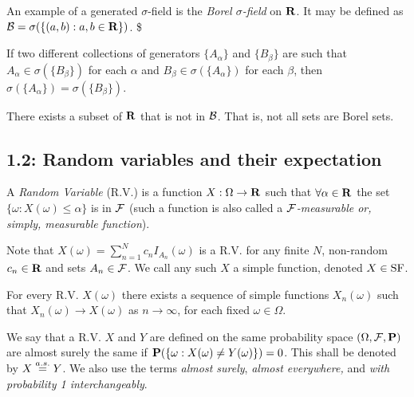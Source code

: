 \begin{example*} 
An example of a generated $\sigma$-field is the \emph{Borel $\sigma$-field} on
$\mathbf{R}$. It may be defined as $\mathcal{B} = \sigma(\{(a, b) : a, b \in \mathbf{R}\})$.
\$
\end{example*} 

\begin{lemma*} 
If two different collections of generators $\{A_\alpha\}$ and $\{B_\beta\}$ are
such that $A_\alpha \in \sigma(\{B_\beta\})$ for each $\alpha$ and $B_\beta \in
\sigma(\{A_\alpha\})$ for each $\beta$, then $\sigma(\{A_\alpha\}) =
\sigma(\{B_\beta\})$.
\end{lemma*} 

\begin{proposition*} 
There exists a subset of $\mathbf{R}$ that is not in $\mathcal{B}$. That is, not all sets are
Borel sets.
\end{proposition*} 


\subsection*{1.2: Random variables and their expectation}
\begin{definition*}
A \emph{Random Variable} (R.V.) is a function $X: \Omega \rightarrow \mathbf{R}$ such
that $\forall \alpha \in \mathbf{R}$ the set $\{\omega: X(\omega) \le \alpha\}$ is in
$\mathcal{F}$ (such a function is also called a \emph{$\mathcal{F}$-measurable or, simply,
measurable function}).
\end{definition*} 


\begin{remark*} 
Note that $X(\omega) = \sum_{n=1}^N c_n I_{A_n} (\omega)$ is a R.V. for any
finite $N$, non-random $c_n \in \mathbf{R}$ and sets $A_n \in \mathcal{F}$. We call any such $X$
a simple function, denoted $X \in \operatorname{SF}$.
\end{remark*} 

\begin{proposition*} 
For every R.V. $X(\omega)$ there exists a sequence of simple functions
$X_n(\omega)$ such that $X_n(\omega) \rightarrow X(\omega)$ as $n\rightarrow
\infty$, for each fixed $\omega \in \Omega$.
\end{proposition*} 

\begin{definition*}
We say that a R.V. $X$ and $Y$ are defined on the same probability space
$(\Omega, \mathcal{F}, \mathbf{P})$ are almost surely the same if $\mathbf{P}(\{\omega: X(\omega) \ne
Y(\omega)\}) = 0$. This shall be denoted by $X \stackrel{a.s.}{=} Y$. We also use the terms
\emph{almost surely}, \emph{almost everywhere,} and \emph{with probability 1
interchangeably}.
\end{definition*} 

